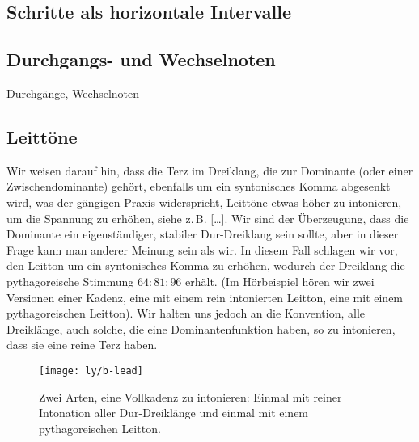 \subsection{Schritte als horizontale Intervalle}

\subsection{Durchgangs- und Wechselnoten}

Durchgänge, Wechselnoten

\subsection{Leittöne}
\label{sec:ln}

Wir weisen darauf hin, dass die Terz im Dreiklang, die zur Dominante (oder einer
Zwischendominante) gehört, ebenfalls um ein syntonisches Komma abgesenkt wird,
was der gängigen Praxis widerspricht, Leittöne etwas höher zu intonieren, um die
Spannung zu erhöhen, siehe z.\,B. […]. Wir sind der
Überzeugung, dass die Dominante ein eigenständiger, stabiler Dur-Dreiklang sein
sollte, aber in dieser Frage kann man anderer Meinung sein als wir. In diesem
Fall schlagen wir vor, den Leitton um ein syntonisches Komma zu erhöhen, wodurch
der Dreiklang die pythagoreische Stimmung $64:81:96$ erhält. (Im Hörbeispiel
hören wir zwei Versionen einer Kadenz, eine mit einem rein intonierten Leitton,
eine mit einem pythagoreischen Leitton). Wir halten uns jedoch an die
Konvention, alle Dreiklänge, auch solche, die eine Dominantenfunktion haben, so
zu intonieren, dass sie eine reine Terz haben.

\begin{figure}
  \centering
  \texttt{[image: ly/b-lead]}
  \caption{Zwei Arten, eine Vollkadenz zu intonieren: Einmal mit reiner
  	Intonation aller Dur-Dreiklänge und einmal mit einem pythagoreischen
  	Leitton.}\label{fig:lead}
\end{figure}

